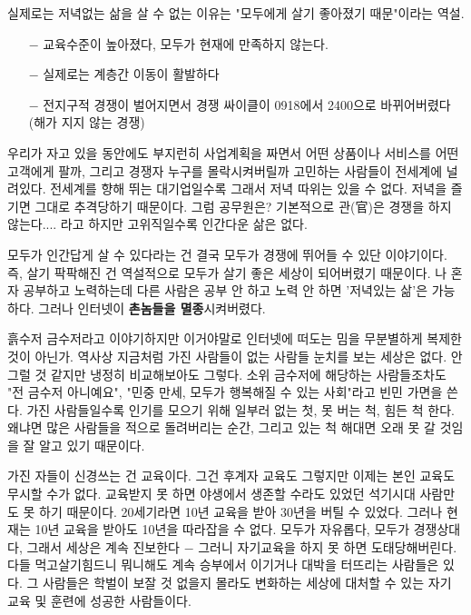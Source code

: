 실제로는 저녁없는 삶을 살 수 없는 이유는 "모두에게 살기 좋아졌기 때문"이라는 역설.
\vspace{5mm}

\begin{enumerate}
    \item [$-$] 교육수준이 높아졌다, 모두가 현재에 만족하지 않는다.
    \item [$-$] 실제로는 계층간 이동이 활발하다
    \item [$-$] 전지구적 경쟁이 벌어지면서 경쟁 싸이클이 0918에서 2400으로 바뀌어버렸다(해가 지지 않는 경쟁)
\end{enumerate}
\vspace{5mm}

우리가 자고 있을 동안에도 부지런히 사업계획을 짜면서 어떤 상품이나 서비스를 어떤 고객에게 팔까,
그리고 경쟁자 누구를 몰락시켜버릴까 고민하는 사람들이 전세계에 널려있다.
전세계를 향해 뛰는 대기업일수록 그래서 저녁 따위는 있을 수 없다. 저녁을 즐기면 그대로 추격당하기 때문이다.
그럼 공무원은? 기본적으로 관(官)은 경쟁을 하지 않는다.... 라고 하지만 고위직일수록 인간다운 삶은 없다.
\vspace{5mm}

모두가 인간답게 살 수 있다라는 건 결국 모두가 경쟁에 뛰어들 수 있단 이야기이다.
즉, 살기 팍팍해진 건 역설적으로 모두가 살기 좋은 세상이 되어버렸기 때문이다.
나 혼자 공부하고 노력하는데 다른 사람은 공부 안 하고 노력 안 하면 '저녁있는 삶'은 가능하다.
그러나 인터넷이 \textbf{촌놈들을 멸종}시켜버렸다.
\vspace{5mm}

흙수저 금수저라고 이야기하지만 이거야말로 인터넷에 떠도는 밈을 무분별하게 복제한 것이 아닌가.
역사상 지금처럼 가진 사람들이 없는 사람들 눈치를 보는 세상은 없다. 안 그럴 것 같지만 냉정히 비교해보아도 그렇다.
소위 금수저에 해당하는 사람들조차도 "전 금수저 아니예요", "민중 만세, 모두가 행복해질 수 있는 사회"라고 빈민 가면을 쓴다.
가진 사람들일수록 인기를 모으기 위해 일부러 없는 첫, 못 버는 척, 힘든 척 한다.
왜냐면 많은 사람들을 적으로 돌려버리는 순간, 그리고 있는 척 해대면 오래 못 갈 것임을 잘 알고 있기 때문이다.
\vspace{5mm}

가진 자들이 신경쓰는 건 교육이다. 그건 후계자 교육도 그렇지만 이제는 본인 교육도 무시할 수가 없다.
교육받지 못 하면 야생에서 생존할 수라도 있었던 석기시대 사람만도 못 하기 때문이다.
20세기라면 10년 교육을 받아 30년을 버틸 수 있었다. 그러나 현재는 10년 교육을 받아도 10년을 따라잡을 수 없다.
모두가 자유롭다, 모두가 경쟁상대다, 그래서 세상은 계속 진보한다 $-$ 그러니 자기교육을 하지 못 하면 도태당해버린다.
다들 먹고살기힘드니 뭐니해도 계속 승부에서 이기거나 대박을 터뜨리는 사람들은 있다.
그 사람들은 학벌이 보잘 것 없을지 몰라도 변화하는 세상에 대처할 수 있는 자기 교육 및 훈련에 성공한 사람들이다.
\vspace{5mm}

